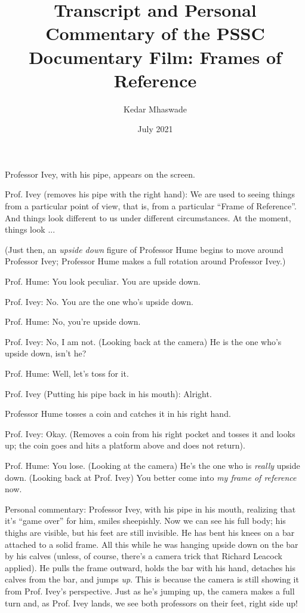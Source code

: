 \documentclass[a6paper]{article}
\begin{document}
\title{Transcript and Personal Commentary of the PSSC Documentary Film: Frames of Reference}
\date{July 2021}
\author{Kedar Mhaswade}
\maketitle

Professor Ivey, with his pipe, appears on the screen.

Prof. Ivey (removes his pipe with the right hand): We are used to seeing things from a particular point of view, that is, from a particular ``Frame of Reference''. And things look different to us under different circumstances. At the moment, things look ...

(Just then, an \emph{upside down} figure of Professor Hume begins to move around Professor Ivey; Professor Hume makes a full rotation around Professor Ivey.)

Prof. Hume: You look peculiar. You are upside down.

Prof. Ivey: No. You are the one who's upside down.

Prof. Hume: No, you're upside down.

Prof. Ivey: No, I am not. (Looking back at the camera) He is the one who's upside down, isn't he?

Prof. Hume: Well, let's toss for it.

Prof. Ivey (Putting his pipe back in his mouth): Alright.

Professor Hume tosses a coin and catches it in his right hand. 

Prof. Ivey: Okay. (Removes a coin from his right pocket and tosses it and looks up; the coin goes and hits a platform above and does not return).

Prof. Hume: You lose. (Looking at the camera) He's the one who is \emph{really} upside down. (Looking back at Prof. Ivey) You better come into \emph{my frame of reference} now.

Personal commentary: Professor Ivey, with his pipe in his mouth, realizing that it's ``game over'' for him, smiles sheepishly. Now we can see his full body; his thighs are visible, but his feet are still invisible. He has bent his knees on a bar attached to a solid frame. All this while he was hanging upside down on the bar by his calves (unless, of course, there's a camera trick that Richard Leacock applied). He pulls the frame outward, holds the bar with his hand, detaches his calves from the bar, and jumps \emph{up}. This is because the camera is still showing it from Prof. Ivey's perspective. Just as he's jumping up, the camera makes a full turn and, as Prof. Ivey lands, we see both professors on their feet, right side up! 
\end{document}
